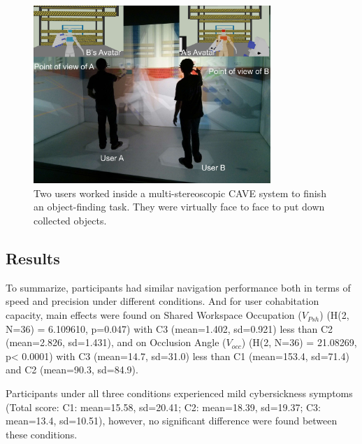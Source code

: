 \begin{figure}[htb]
  \centering
  \includegraphics[width=0.8\textwidth]{figures/ch4/teaser_exp1}
  \caption{\label{fig:4_teaser_exp1}Two users worked inside a multi-stereoscopic CAVE system to finish an object-finding task. They were virtually face to face to put down collected objects.}
\end{figure}

\subsection{Results}
To summarize, participants had similar navigation performance both in terms of speed and precision under different conditions. And for user cohabitation capacity, main effects were found on Shared Workspace Occupation ($V_{Psh}$) (H(2, N=36) = 6.109610, p=0.047) with C3 (mean=1.402, sd=0.921) less than C2 (mean=2.826, sd=1.431), and on Occlusion Angle ($V_{occ}$) (H(2, N=36) = 21.08269, p\textless{} 0.0001) with C3 (mean=14.7, sd=31.0) less than C1 (mean=153.4, sd=71.4) and C2 (mean=90.3, sd=84.9).

Participants under all three conditions experienced mild cybersickness symptoms (Total score: C1: mean=15.58, sd=20.41; C2: mean=18.39, sd=19.37; C3: mean=13.4, sd=10.51), however, no significant difference were found between these conditions.

